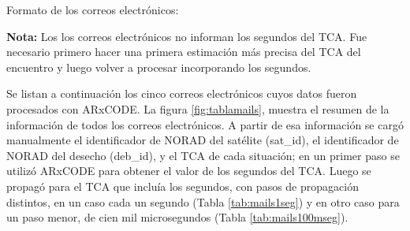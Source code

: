 Formato de los correos electr\'onicos:\\
\begin{center}
\end{center}

{\bf{Nota:}} Los los correos electr\'onicos no informan los segundos del TCA. Fue necesario primero hacer una primera estimaci\'on m\'as precisa del TCA del encuentro y luego volver a procesar incorporando los segundos. 

Se listan a continuaci\'on los cinco correos electr\'onicos cuyos datos fueron procesados con ARxCODE. La figura \ref{fig:tablamails}, muestra el resumen de la informaci\'on de todos los correos electr\'onicos. A partir de esa informaci\'on se carg\'o manualmente el identificador de NORAD del sat\'elite (sat\_id), el identificador de NORAD del desecho (deb\_id), y el TCA de cada situaci\'on; en un primer paso se utiliz\'o ARxCODE para obtener el valor de los segundos del TCA. Luego se propag\'o para el TCA que inclu\'ia los segundos, con pasos de propagaci\'on distintos, en un caso cada un segundo (Tabla \ref{tab:mails1seg}) y en otro caso para un paso menor, de cien mil microsegundos (Tabla \ref{tab:mails100mseg}).\\

